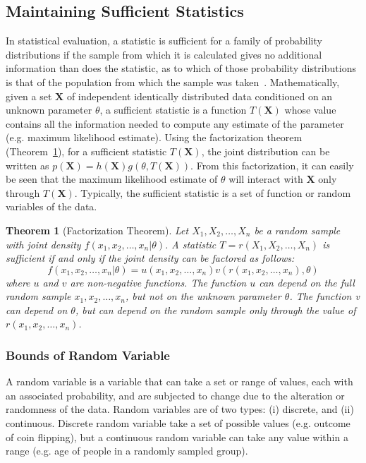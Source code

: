 \documentclass[a4paper, 11pt, oneside]{book}
\newtheorem{theorem}{Theorem}[section]
\begin{document}
\subsection{Maintaining Sufficient Statistics}
In statistical evaluation, a statistic is sufficient for a family of probability distributions if the sample from which it is calculated gives no additional information than does the statistic, as to which of those probability distributions is that of the population from which the sample was taken~\cite{fisher22:suffstat}. Mathematically, given a set  $\mathbf{X}$ of independent identically distributed data conditioned on an unknown parameter $\theta$, a sufficient statistic is a function $T(\mathbf{X})$ whose value contains all the information needed to compute any estimate of the parameter (e.g. maximum likelihood estimate). Using the factorization theorem (Theorem~\ref{thm:factor}), for a sufficient statistic $T(\mathbf{X})$, the joint distribution can be written as $ p(\mathbf{X}) = h(\mathbf{X}) g(\theta, T(\mathbf{X}))$. From this factorization, it can easily be seen that the maximum likelihood estimate of $\theta$ will interact with $\mathbf{X}$ only through $T(\mathbf{X})$. Typically, the sufficient statistic is a set of function or random variables of the data.

\begin{theorem}[Factorization Theorem]
    \label{thm:factor}
    Let $X_1, X_2, \dots , X_n$ be a random sample with joint density $f(x_1, x_2, \dots , x_n| \theta)$. A statistic $T = r(X_1, X_2, \dots , X_n)$ is sufficient if and only if the joint density can be factored as follows:
    \[
    f(x_1, x_2, \dots , x_n| \theta) = u(x_1, x_2, \dots , x_n) v(r(x_1, x_2, \dots , x_n), \theta)
    \]
    where $u$ and $v$ are non-negative functions. The function $u$ can depend on the full random sample $x_1, x_2, \dots , x_n$, but not on the unknown parameter $\theta$. The function v can depend on $\theta$, but can depend on the random sample only through the value of $r(x_1, x_2, \dots , x_n)$.
\end{theorem}

\subsubsection{Bounds of Random Variable}
A random variable is a variable that can take a set or range of values, each with an associated probability, and are subjected to change due to the alteration or randomness of the data. Random variables are of two types: (i) discrete, and (ii) continuous. Discrete random variable take a set of possible values (e.g. outcome of coin flipping), but a continuous random variable can take any value within a range (e.g. age of people in a randomly sampled group).
\end{document}
